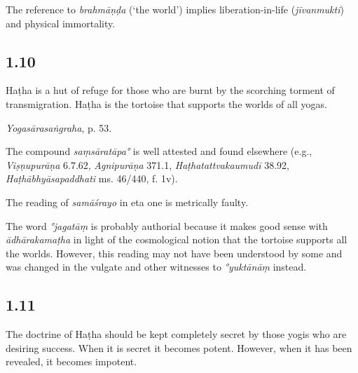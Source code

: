 \begin{ekdosis}
\begin{testimonia}[hp01_009]
\end{testimonia}

\begin{philcomm}[hp01_009]        
The reference to \emph{brahmāṇḍa} (‘the world’) implies liberation-in-life (\emph{jīvanmukti}) and physical immortality.  
\end{philcomm}

\subsection*{1.10}
\begin{translation}[hp01_010]
Haṭha is a hut of refuge for those who are burnt by the scorching torment of transmigration. Haṭha is the tortoise that supports the worlds of all yogas.
\end{translation}

\begin{testimonia}[hp01_010]
\emph{Yogasārasaṅgraha}, p. 53.

\begin{versinnote}
\end{versinnote}

\end{testimonia}

\begin{philcomm}[hp01_010] 
The compound \emph{saṃsāratāpa°} is well attested and found elsewhere (e.g., \emph{Viṣṇupurāṇa} 6.7.62, \emph{Agnipurāṇa} 371.1, \emph{Haṭhatattvakaumudī} 38.92, \emph{Haṭhābhyāsapaddhati} ms. 46/440, f. 1v). 

The reading of \emph{samāśrayo} in eta one is metrically faulty. 

The word \emph{°jagatāṃ} is probably authorial because it makes good sense with  \emph{ādhārakamaṭha} in light of the cosmological notion that the tortoise supports all the worlds. However, this reading may not have been understood by some and was changed in the vulgate and other witnesses to \emph{°yuktānāṃ} instead.      
\end{philcomm}

\subsection*{1.11}
\begin{translation}[hp01_011]
The doctrine of Haṭha should be kept completely secret by those yogis who are desiring success. When it is secret it becomes potent. However, when it has been revealed, it becomes impotent.
\end{translation}


\end{ekdosis}
